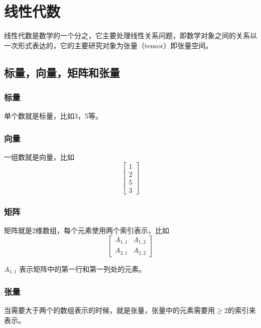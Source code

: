 
\chapter{线性代数}

线性代数是数学的一个分之，它主要处理线性关系问题，即数学对象之间的关系以一次形式表达的，它的主要研究对象为张量（tensor）即张量空间。


\section{标量，向量，矩阵和张量}

\subsection{标量}

单个数就是标量，比如3，5等。

\subsection{向量}

一组数就是向量，比如
\begin{equation}
  \begin{bmatrix}
    1 \\
    2 \\
    5 \\
    3
  \end{bmatrix}
\end{equation}

\subsection{矩阵}

矩阵就是2维数组，每个元素使用两个索引表示，比如
\begin{equation}
  \begin{bmatrix}
    A_{1,1} & A_{1,2} \\
    A_{2,1} & A_{2,2}
  \end{bmatrix}
\end{equation}

$A_{1,1}$ 表示矩阵中的第一行和第一列处的元素。

\subsection{张量}

当需要大于两个的数组表示的时候，就是张量，张量中的元素需要用$\ge 2$的索引来表示。


